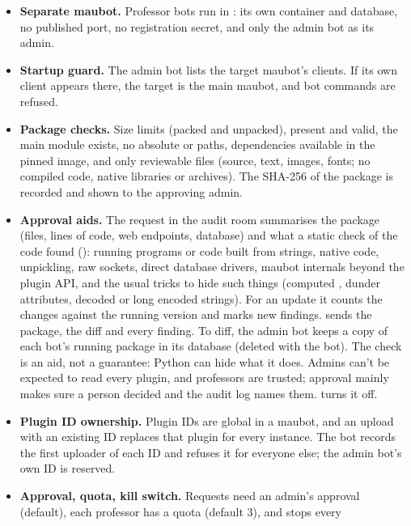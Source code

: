 \begin{itemize}
  \item \textbf{Separate maubot.} Professor bots run in : its own container and
        database, no published port, no registration secret, and only the admin bot as its
        admin.
  \item \textbf{Startup guard.} The admin bot lists the target maubot's clients. If its own
        client appears there, the target is the main maubot, and bot commands are refused.
  \item \textbf{Package checks.} Size limits (packed and unpacked),  present
        and valid, the main module exists, no absolute or  paths, dependencies
        available in the pinned image, and only reviewable files (source, text, images, fonts;
        no compiled code, native libraries or archives). The SHA-256 of the package is
        recorded and shown to the approving admin.
  \item \textbf{Approval aids.} The request in the audit room summarises the package (files,
        lines of code, web endpoints, database) and what a static check of the code found
        (): running programs or code built from strings, native code,
        unpickling, raw sockets, direct database drivers, maubot internals beyond the plugin
        API, and the usual tricks to hide such things (computed , dunder
        attributes, decoded or long encoded strings). For an update it counts the changes
        against the running version and marks new findings. 
        sends the package, the diff and every finding. To diff, the admin bot keeps a copy of
        each bot's running package in its database (deleted with the bot). The check is an
        aid, not a guarantee: Python can hide what it does. Admins can't be expected to read
        every plugin, and professors are trusted; approval mainly makes sure a person decided
        and the audit log names them.  turns it off.
  \item \textbf{Plugin ID ownership.} Plugin IDs are global in a maubot, and an upload with an
        existing ID replaces that plugin for every instance. The bot records the first
        uploader of each ID and refuses it for everyone else; the admin bot's own ID is
        reserved.
  \item \textbf{Approval, quota, kill switch.} Requests need an admin's approval (default),
        each professor has a quota (default 3), and  stops every

\end{itemize}

